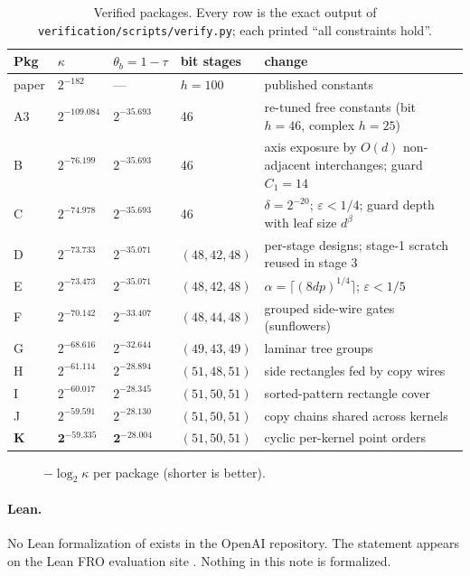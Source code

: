 \begin{table}[ht]
\centering
\small
\begin{tabularx}{\textwidth}{@{}l l l l X@{}}
\toprule
Pkg & $\kappa$ & $\theta_b = 1-\tau$ & bit stages & change \\
\midrule
paper & $2^{-182}$ & --- & $h=100$ & published constants \\
A3 & $2^{-109.084}$ & $2^{-35.693}$ & 46 & re-tuned free constants (bit $h = 46$, complex $h = 25$) \\
B & $2^{-76.199}$ & $2^{-35.693}$ & 46 & axis exposure by $O(d)$ non-adjacent interchanges; guard $C_1 = 14$ \\
C & $2^{-74.978}$ & $2^{-35.693}$ & 46 & $\delta = 2^{-20}$; $\varepsilon < 1/4$; guard depth with leaf size $d^\beta$ \\
D & $2^{-73.733}$ & $2^{-35.071}$ & $(48,42,48)$ & per-stage designs; stage-1 scratch reused in stage 3 \\
E & $2^{-73.473}$ & $2^{-35.071}$ & $(48,42,48)$ & $\alpha = \lceil (8dp)^{1/4}\rceil$; $\varepsilon < 1/5$ \\
F & $2^{-70.142}$ & $2^{-33.407}$ & $(48,44,48)$ & grouped side-wire gates (sunflowers) \\
G & $2^{-68.616}$ & $2^{-32.644}$ & $(49,43,49)$ & laminar tree groups \\
H & $2^{-61.114}$ & $2^{-28.894}$ & $(51,48,51)$ & side rectangles fed by copy wires \\
I & $2^{-60.017}$ & $2^{-28.345}$ & $(51,50,51)$ & sorted-pattern rectangle cover \\
J & $2^{-59.591}$ & $2^{-28.130}$ & $(51,50,51)$ & copy chains shared across kernels \\
\textbf{K} & $\mathbf{2^{-59.335}}$ & $\mathbf{2^{-28.004}}$ & $(51,50,51)$ & cyclic per-kernel point orders \\
\bottomrule
\end{tabularx}
\caption{Verified packages. Every row is the exact output of \texttt{verification/scripts/verify.py}; each printed ``all constraints hold''.}
\label{tab:packages}
\end{table}

\begin{figure}[ht]
\centering

\caption{$-\log_2\kappa$ per package (shorter is better).}
\label{fig:bars}
\end{figure}

\paragraph{Lean.} No Lean formalization of \cite{OAI} exists in the OpenAI repository. The statement appears on the Lean FRO evaluation site \cite{LeanEval}. Nothing in this note is formalized.

